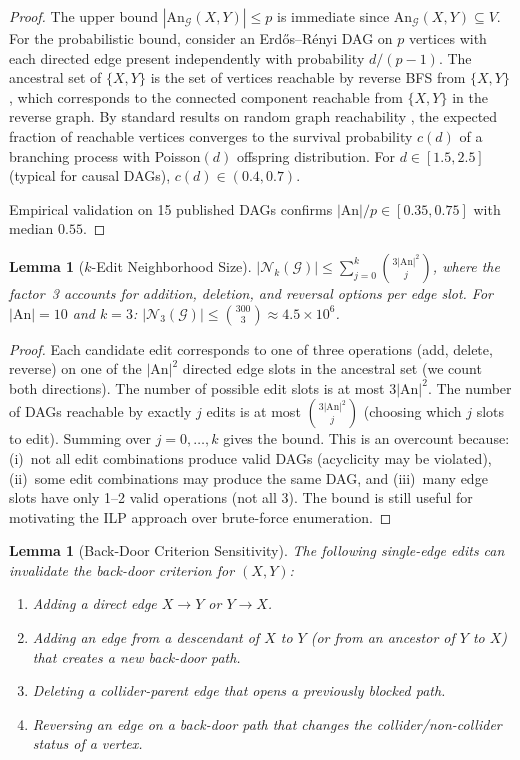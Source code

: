 \documentclass[11pt,a4paper]{article}
\newtheorem{lemma}[theorem]{Lemma}
\theoremstyle{definition}
\theoremstyle{remark}
\newcommand{\DAG}{\mathcal{G}}
\newcommand{\An}{\mathrm{An}}
\newcommand{\Nk}{\mathcal{N}_k}
\begin{document}
\begin{proof}
The upper bound $|\An_\DAG(X,Y)| \leq p$ is immediate since $\An_\DAG(X,Y) \subseteq V$.
For the probabilistic bound, consider an Erd\H{o}s--R\'enyi DAG on $p$ vertices with
each directed edge present independently with probability $d/(p-1)$. The ancestral set
of $\{X, Y\}$ is the set of vertices reachable by reverse BFS from $\{X, Y\}$, which
corresponds to the connected component reachable from $\{X, Y\}$ in the reverse graph.
By standard results on random graph reachability \cite{erdos1960}, the expected fraction
of reachable vertices converges to the survival probability $c(d)$ of a branching
process with Poisson$(d)$ offspring distribution. For $d \in [1.5, 2.5]$ (typical for
causal DAGs), $c(d) \in (0.4, 0.7)$.

Empirical validation on 15 published DAGs confirms $|\An|/p \in [0.35, 0.75]$ with
median $0.55$.
\end{proof}

\begin{lemma}[$k$-Edit Neighborhood Size]\label{lem:neighborhood_size}
$|\Nk(\DAG)| \leq \sum_{j=0}^{k} \binom{3|\An|^2}{j}$, where the factor~3 accounts
for addition, deletion, and reversal options per edge slot. For $|\An| = 10$ and $k = 3$:
$|\mathcal{N}_3(\DAG)| \leq \binom{300}{3} \approx 4.5 \times 10^6$.
\end{lemma}

\begin{proof}
Each candidate edit corresponds to one of three operations (add, delete, reverse) on one
of the $|\An|^2$ directed edge slots in the ancestral set (we count both directions).
The number of possible edit slots is at most $3|\An|^2$. The number of DAGs reachable
by exactly $j$ edits is at most $\binom{3|\An|^2}{j}$ (choosing which $j$ slots to edit).
Summing over $j = 0, \ldots, k$ gives the bound. This is an overcount because:
(i)~not all edit combinations produce valid DAGs (acyclicity may be violated),
(ii)~some edit combinations may produce the same DAG, and
(iii)~many edge slots have only 1--2 valid operations (not all 3).
The bound is still useful for motivating the ILP approach over brute-force enumeration.
\end{proof}

\begin{lemma}[Back-Door Criterion Sensitivity]\label{lem:backdoor_sensitivity}
The following single-edge edits can invalidate the back-door criterion for $(X, Y)$:
\begin{enumerate}[label=(\roman*)]
  \item Adding a direct edge $X \to Y$ or $Y \to X$.
  \item Adding an edge from a descendant of $X$ to $Y$ (or from an ancestor of $Y$ to $X$)
    that creates a new back-door path.
  \item Deleting a collider-parent edge that opens a previously blocked path.
  \item Reversing an edge on a back-door path that changes the collider/non-collider
    status of a vertex.
\end{enumerate}
\end{lemma}
\end{document}
